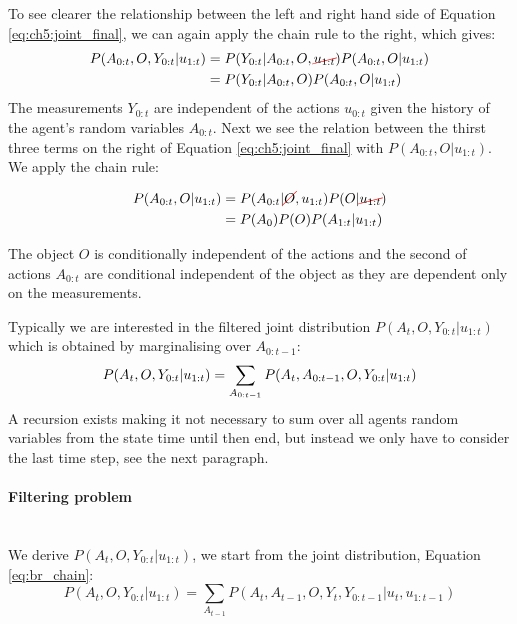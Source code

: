 \begin{appendices}
To see clearer the relationship between the left and right hand side of Equation \ref{eq:ch5:joint_final}, 
we can again apply the chain rule to the right, which gives:
\begin{align}
 P(A_{0:t},O,Y_{0:t}|u_{1:t}) &=  P(Y_{0:t}|A_{0:t},O,\Ccancel[red]{u_{1:t}}) P(A_{0:t},O|u_{1:t}) \\
			      &=  P(Y_{0:t}|A_{0:t},O) P(A_{0:t},O|u_{1:t})
\end{align}
The measurements $Y_{0:t}$ are independent of the actions $u_{0:t}$  given the history of the agent's random 
variables $A_{0:t}$. Next we see the relation between the thirst three terms on the right of Equation \ref{eq:ch5:joint_final}
with $P(A_{0:t},O|u_{1:t})$. We apply the chain rule:

\begin{align}
 P(A_{0:t},O|u_{1:t}) &= P(A_{0:t}|\Ccancel[red]{O},u_{1:t}) P(O|\Ccancel[red]{u_{1:t}}) \\
		      &= P(A_0) P(O) P(A_{1:t}|u_{1:t}) 
\end{align}

The object $O$ is conditionally independent of the actions and the second of actions $A_{0:t}$ are conditional independent 
of the object as they are dependent only on the measurements.

Typically we are interested in the filtered joint distribution $P(A_t,O,Y_{0:t}|u_{1:t})$ which 
is obtained by marginalising over $A_{0:t-1}$:
\begin{equation}
  P(A_t,O,Y_{0:t}|u_{1:t}) = \sum_{A_{0:t-1}}  P(A_t,A_{0:t-1},O,Y_{0:t}|u_{1:t}) \\
\end{equation}
A recursion exists making it not necessary to sum over all agents random variables from the state time 
until then end, but instead we only have to consider the last time step, see the next paragraph.

\paragraph{Filtering problem}\\
We derive $P(A_t,O,Y_{0:t}|u_{1:t})$, we start from the joint distribution, Equation \ref{eq:br_chain}:
\begin{equation}
   P(A_t,O,Y_{0:t}|u_{1:t})  = \sum_{A_{t-1}} P(A_t,A_{t-1},O,Y_t,Y_{0:t-1}|u_{t},u_{1:t-1}) \label{eq:br_chain} 
\end{equation}


\end{appendices}
